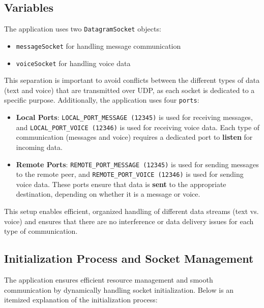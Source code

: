 \documentclass{article}
\begin{document}
\subsection{Variables}
The application uses two \texttt{DatagramSocket} objects:
\begin{itemize}
    \item \texttt{messageSocket} for handling message communication
    \item \texttt{voiceSocket} for handling voice data
\end{itemize}
This separation is important to avoid conflicts between the different types of data (text and voice) that are transmitted over UDP, 
as each socket is dedicated to a specific purpose. Additionally, the application uses four \texttt{ports}:
\begin{itemize}
    \item \textbf{Local Ports}: \texttt{LOCAL\_PORT\_MESSAGE (12345)} is used for receiving messages, and \texttt{LOCAL\_PORT\_VOICE (12346)} is used 
    for receiving voice data. Each type of communication (messages and voice) requires a dedicated port to \textbf{listen} for incoming data.
    \item \textbf{Remote Ports}: \texttt{REMOTE\_PORT\_MESSAGE (12345)} is used for sending messages to the remote peer, and \texttt{REMOTE\_PORT\_VOICE (12346)} 
    is used for sending voice data. These ports ensure that data is \textbf{sent} to the appropriate destination, depending on whether it is a message or voice.
\end{itemize}
This setup enables efficient, organized handling of different data streams (text vs. voice) and ensures that there are no interference or 
data delivery issues for each type of communication.

\subsection{Initialization Process and Socket Management}
The application ensures efficient resource management and smooth communication by dynamically handling socket initialization. Below is an 
itemized explanation of the initialization process:
\end{document}

